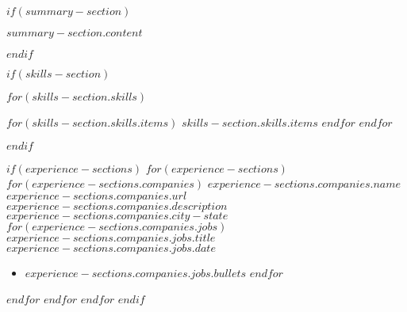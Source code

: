 

\newcommand{\headerinfo}{
    \textbf{\Large $contact.name.first$ $contact.name.last$} \hfill
    $contact.address.county$, $contact.address.state$ \hfill
    ($contact.phone.area_code$) $contact.phone.number$ \hfill
    \href{$contact.email.link$}{$contact.email.address$} \hfill
    \href{$contact.linkedin.url$}{$contact.linkedin.text$} \hfill
    \href{$contact.gitlab.url$}{$contact.gitlab.text$}
}



\thispagestyle{firstpageheaderstyle}

\pagestyle{subsequentpageheaderstyle}

$if(summary-section)$
\begin{justify}
\vspace{-7.5pt}
$summary-section.content$
\end{justify}
$endif$

$if(skills-section)$
\vspace{-13pt}
\begin{description}[align=right,labelwidth=\skillswidth]
\setlength\itemsep{-2pt}
$for(skills-section.skills)$
\item [$skills-section.skills.heading$:]
\commasep{\ensuremath{\cdot}}
$for(skills-section.skills.items)$
$skills-section.skills.items$
$endfor$
\endcommasep
$endfor$
\end{description}
$endif$

$if(experience-sections)$
$for(experience-sections)$
    $for(experience-sections.companies)$
        \company
        {$experience-sections.companies.name$}
        {$experience-sections.companies.url$}
        {$experience-sections.companies.description$}
        {$experience-sections.companies.city-state$}
        $for(experience-sections.companies.jobs)$
            \jobtitle
            {$experience-sections.companies.jobs.title$}
            {$experience-sections.companies.jobs.date$}
            \begin{itemize}
            \setlength\itemsep{-2pt}
            $for(experience-sections.companies.jobs.bullets)$
                \item $experience-sections.companies.jobs.bullets$
            $endfor$
            \end{itemize}
            \vspace{-5pt}
        $endfor$
        \vspace{5pt}
    $endfor$
    \vspace{-1pt}
$endfor$
$endif$

